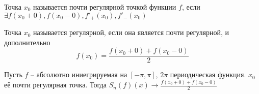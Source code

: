 \documentclass[document.tex]{subfiles}
\begin{document}
\begin{definition}
	Точка $x_0$ называется почти регулярной точкой функции $f$, если $\exists f(x_0+0), f(x_0-0), f'_+(x_0), f'_-(x_0)$
\end{definition}

\begin{definition}
	Точка $x_0$ называется регулярной, если она является почти регулярной, и дополнительно $$f(x_0) = \frac{f(x_0+0) + f(x_0 -0)}{2}$$
\end{definition}

\begin{theorem}
	Пусть $f$ -- абсолютно иниегрируемая на $[-\pi, \pi]$, $2\pi$ периодическая функция. $x_0$ её почти регулярная точка. Тогда
	$S_n(f)(x) \rightarrow \frac{f(x_0+0)+f(x_0-0)}{2}$
\end{theorem}
\end{document}
